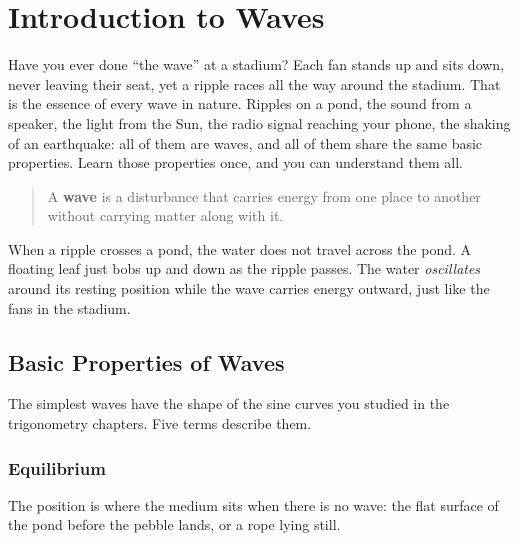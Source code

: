 \chapter{Introduction to Waves}

Have you ever done ``the wave'' at a stadium? Each fan stands up and sits
down, never leaving their seat, yet a ripple races all the way around the
stadium. That is the essence of every wave in nature. Ripples on a pond,
the sound from a speaker, the light from the Sun, the radio signal reaching
your phone, the shaking of an earthquake: all of them are waves, and all of
them share the same basic properties. Learn those properties once, and you
can understand them all.

\begin{quote}
A \textbf{wave} is a disturbance that carries energy from one
place to another without carrying matter along with it.
\end{quote}

When a ripple crosses a pond, the water does not travel across the pond. A
floating leaf just bobs up and down as the ripple passes. The water
\emph{oscillates} around its resting position while the wave carries energy
outward, just like the fans in the stadium.

\section{Basic Properties of Waves}

The simplest waves have the shape of the sine curves you studied in the
trigonometry chapters. Five terms describe them.

\begin{center}
\end{center}

\subsection*{Equilibrium}
The  position is where the medium
sits when there is no wave: the flat surface of the pond before the pebble
lands, or a rope lying still.

